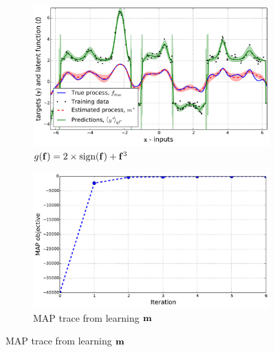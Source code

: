 \documentclass{article} %
\begin{document}
\begin{figure}[tb]
    \begin{subfigure}[b]{0.5\linewidth}
        \includegraphics[width=\linewidth]{fig/signdemo}
        \caption{$g\!\left({{\mathbf{f}}}\right) = 2\times\text{sign}\!\left({\mathbf{f}}\right)
            + \mathbf{f}^3$}
        \label{sub:sign}
    \end{subfigure}
    \begin{subfigure}[b]{0.5\linewidth}
        \includegraphics[width=\linewidth]{fig/trace_end}
        \caption{MAP trace from learning $\mathbf{m}$}
        \label{sub:mape}
        \vspace{1.5mm}
    \end{subfigure}


\end{figure}
\end{document}
